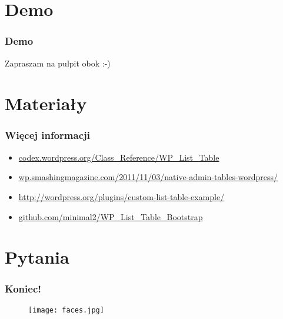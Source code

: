 \documentclass[a4paper, 16pt]{beamer}
\begin{document}
	\section{Demo}
		\begin{frame}
			\frametitle{Demo}
			\begin{center}
				Zapraszam na pulpit obok :-)
			\end{center}
		\end{frame}
	\section{Materiały}
		\begin{frame}
			\frametitle{Więcej informacji}
			\begin{itemize}
				\item{\href{http://codex.wordpress.org/Class_Reference/WP_List_Table}{codex.wordpress.org/Class\_Reference/WP\_List\_Table}}
				\item{\href{http://wp.smashingmagazine.com/2011/11/03/native-admin-tables-wordpress/}{wp.smashingmagazine.com/2011/11/03/native-admin-tables-wordpress/}}
				\item{\href{http://wordpress.org/plugins/custom-list-table-example/}{http://wordpress.org/plugins/custom-list-table-example/}}
				\item{\color{gray}\href{http://github.com/minimal2/WP_List_Table_Bootstrap}{github.com/minimal2/WP\_List\_Table\_Bootstrap}}
			\end{itemize}
		\end{frame}
	\section{Pytania}
		\begin{frame}
			\frametitle{Koniec!}
			\begin{figure}
				\centering
				\texttt{[image: faces.jpg]}
			\end{figure}
		\end{frame}
\end{document}
